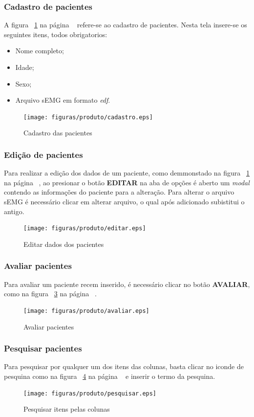 \subsubsection{Cadastro de pacientes}
A figura ~\ref{figcadastro} na página ~\pageref{figcadastro} refere-se ao cadastro de pacientes. Nesta tela insere-se os seguintes itens, todos obrigatorios:
\begin{itemize}
	\item Nome completo;
	\item Idade;
	\item Sexo;
	\item Arquivo sEMG em formato \textit{edf}.
\end{itemize}

\begin{figure}[!htb]
	\centering
	\texttt{[image: figuras/produto/cadastro.eps]}
    \caption{Cadastro das pacientes}
    \label{figcadastro}
\end{figure}

\subsubsection{Edição de pacientes}
Para realizar a edição dos dados de um paciente, como demmonstado na figura ~\ref{figcadastro} na página ~\pageref{figcadastro}, ao presionar o botão \textbf{EDITAR} na aba de opções é aberto um \textit{modal} contendo as informações do paciente para a alteração. Para alterar o arquivo sEMG é necessário clicar em alterar arquivo, o qual após adicionado subistitui o antigo.

\begin{figure}[!htb]
    \centering
    \texttt{[image: figuras/produto/editar.eps]}
    \caption{Editar dados dos pacientes}
    \label{figeditar}
\end{figure}

\subsubsection{Avaliar pacientes}
Para avaliar um paciente recem inserido, é necessário clicar no botão \textbf{AVALIAR}, como na figura ~\ref{figavaliar} na página ~\pageref{figavaliar}.
\begin{figure}[!htb]
    \centering
    \texttt{[image: figuras/produto/avaliar.eps]}
    \caption{Avaliar pacientes}
    \label{figavaliar}
\end{figure}

\subsubsection{Pesquisar pacientes}
Para pesquisar por qualquer um dos itens das colunas, basta clicar no iconde de pesquina como na figura ~\ref{figpesquisar} na página ~\pageref{figpesquisar} e inserir o termo da pesquina.
\begin{figure}[!htb]
    \centering
    \texttt{[image: figuras/produto/pesquisar.eps]}
    \caption{Pesquisar itens pelas colunas}
    \label{figpesquisar}
\end{figure}


